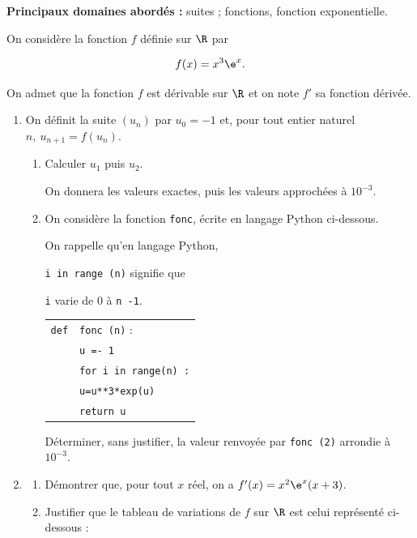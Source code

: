 \medskip

\textbf{Principaux domaines abordés :}
suites ;
fonctions, fonction exponentielle.

\medskip

On considère la fonction $f$ définie sur $\R$ par

\[f(x) = x^3\e^x.\]

On admet que la fonction $f$ est dérivable sur $\R$ et on note $f'$ sa fonction dérivée.

\medskip

\begin{enumerate}
\item On définit la suite $\left(u_n\right)$ par $u_0 = - 1$ et, pour tout entier naturel $n,\: u_{n+1} = f\left(u_n\right)$.
	\begin{enumerate}
		\item Calculer $u_1$ puis $u_2$.
		
On donnera les valeurs exactes, puis les valeurs approchées à $10^{-3}$.
		\item On considère la fonction \texttt{fonc}, écrite en langage Python ci-dessous.

\smallskip

\begin{minipage}{0.524\linewidth}
On rappelle qu'en langage Python, 

\og \texttt{i in range (n)}\fg{} signifie que 

\texttt{i} varie de 0 à \texttt{n -1}.
\end{minipage}\hfill
\begin{minipage}{0.40\linewidth}
\begin{tabular}{|l l|}\hline
\texttt{def}& \texttt{fonc (n)} :\\
&\texttt{u =- 1}\\
&\texttt{for i in range(n) :}\\
&\quad \texttt{u=u**3*exp(u)}\\
&\texttt{return u}\\\hline
\end{tabular}
\end{minipage}

Déterminer, sans justifier, la valeur renvoyée par \texttt{fonc (2)} arrondie à $10^{-3}$.
	\end{enumerate}
\item 
	\begin{enumerate}
		\item Démontrer que, pour tout $x$ réel, on a $f'(x) = x^2\e^x(x + 3)$.
		\item Justifier que le tableau de variations de $f$ sur $\R$ est celui représenté
ci-dessous :


\end{enumerate}
\end{enumerate}
